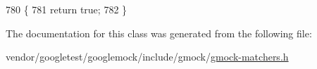 \begin{DoxyCode}
780                                            \{
781     \textcolor{keywordflow}{return} \textcolor{keyword}{true};
782   \}
\end{DoxyCode}


The documentation for this class was generated from the following file\+:\begin{DoxyCompactItemize}
\item 
vendor/googletest/googlemock/include/gmock/\hyperlink{gmock-matchers_8h}{gmock-\/matchers.\+h}\end{DoxyCompactItemize}
